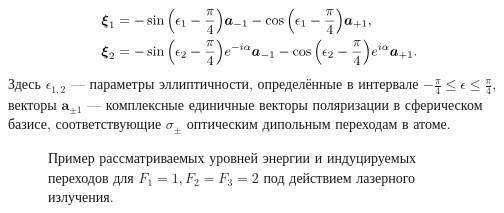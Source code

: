 \begin{equation} \label{eqn:xi}
    \begin{aligned}
        &\boldsymbol{\xi}_1 = -\sin{\left(\epsilon_1 - \frac{\pi}{4}\right)}\boldsymbol{a}_{-1} - \cos{\left(\epsilon_1 - \frac{\pi}{4}\right)}\boldsymbol{a}_{+1}, \\
        &\boldsymbol{\xi}_2 = -\sin{\left(\epsilon_2 - \frac{\pi}{4}\right)}e^{ - i\alpha}\boldsymbol{a}_{-1} - \cos{\left(\epsilon_2 - \frac{\pi}{4}\right)}e^{ i\alpha}\boldsymbol{a}_{+1}.
    \end{aligned}
\end{equation}
Здесь $\epsilon_{1,2}$ --- параметры эллиптичности, определённые в интервале $-\frac{\pi}{4} \leq \epsilon \leq \frac{\pi}{4}$, векторы $\boldsymbol{a}_{\pm 1}$ --- комплексные единичные векторы поляризации в сферическом базисе, соответствующие $\sigma_{\pm}$ оптическим дипольным переходам в атоме.
\begin{figure}[ht]
    \caption{Пример рассматриваемых уровней энергии и индуцируемых переходов для $F_{1}=1, F_{2}=F_{3}=2$ под действием лазерного излучения.}\label{fig:latex}
\end{figure}

\FloatBarrier

